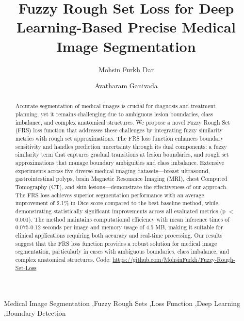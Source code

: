 \documentclass[review]{elsarticle}
\begin{document}
\begin{frontmatter}
\author[1]{Mohsin Furkh Dar}

\author[1]{Avatharam Ganivada }



           
\title{Fuzzy Rough Set Loss for Deep Learning-Based Precise Medical Image Segmentation}


\begin{abstract}
Accurate segmentation of medical images is crucial for diagnosis and treatment planning, yet it remains challenging due to ambiguous lesion boundaries, class imbalance, and complex anatomical structures. We propose a novel Fuzzy Rough Set (FRS) loss function that addresses these challenges by integrating fuzzy similarity metrics with rough set approximations. The FRS loss function enhances boundary sensitivity and handles prediction uncertainty through its dual components: a fuzzy similarity term that captures gradual transitions at lesion boundaries, and rough set approximations that manage boundary ambiguities and class imbalance. Extensive experiments across five diverse medical imaging datasets—breast ultrasound, gastrointestinal polyps, brain Magnetic Resonance Imaging (MRI), chest Computed Tomography (CT), and skin lesions—demonstrate the effectiveness of our approach. The FRS loss achieves superior segmentation performance with an average improvement of 2.1\% in Dice score compared to the best baseline method, while demonstrating statistically significant improvements across all evaluated metrics (p $<$ 0.001). The method maintains computational efficiency with mean inference times of 0.075-0.12 seconds per image and memory usage of 4.5 MB, making it suitable for clinical applications requiring both accuracy and real-time processing. Our results suggest that the FRS loss function provides a robust solution for medical image segmentation, particularly in cases with ambiguous boundaries, class imbalance, and complex anatomical structures. Code: \href{https://github.com/MohsinFurkh/Fuzzy-Rough-Set-Loss}{https://github.com/MohsinFurkh/Fuzzy-Rough-Set-Loss}
\end{abstract}

\begin{keyword}Medical Image Segmentation \sep Fuzzy Rough Sets \sep Loss Function \sep Deep Learning \sep Boundary Detection
\end{keyword}


\end{frontmatter}
\linenumbers
\end{document}
